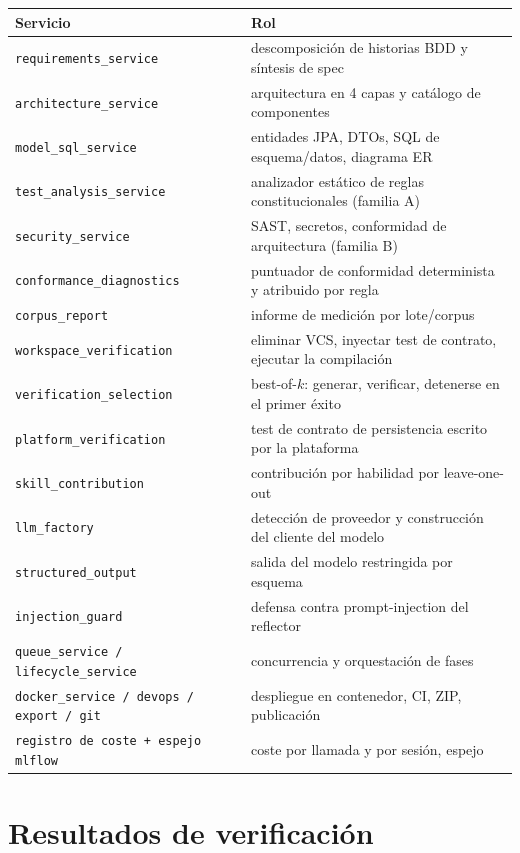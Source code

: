 \documentclass[11pt,a4paper]{article}
\begin{document}
\begin{center}
\begin{longtable}{@{}p{}p{}@{}}
\toprule
\textbf{Servicio} & \textbf{Rol} \\
\midrule
\texttt{requirements\_service} & descomposición de historias BDD y síntesis de spec \\
\texttt{architecture\_service} & arquitectura en 4 capas y catálogo de componentes \\
\texttt{model\_sql\_service} & entidades JPA, DTOs, SQL de esquema/datos, diagrama ER \\
\texttt{test\_analysis\_service} & analizador estático de reglas constitucionales (familia A) \\
\texttt{security\_service} & SAST, secretos, conformidad de arquitectura (familia B) \\
\texttt{conformance\_diagnostics} & puntuador de conformidad determinista y atribuido por regla \\
\texttt{corpus\_report} & informe de medición por lote/corpus \\
\texttt{workspace\_verification} & eliminar VCS, inyectar test de contrato, ejecutar la compilación \\
\texttt{verification\_selection} & best-of-$k$: generar, verificar, detenerse en el primer éxito \\
\texttt{platform\_verification} & test de contrato de persistencia escrito por la plataforma \\
\texttt{skill\_contribution} & contribución por habilidad por leave-one-out \\
\texttt{llm\_factory} & detección de proveedor y construcción del cliente del modelo \\
\texttt{structured\_output} & salida del modelo restringida por esquema \\
\texttt{injection\_guard} & defensa contra prompt-injection del reflector \\
\texttt{queue\_service / lifecycle\_service} & concurrencia y orquestación de fases \\
\texttt{docker\_service / devops / export / git} & despliegue en contenedor, CI, ZIP, publicación \\
\texttt{registro de coste + espejo mlflow} & coste por llamada y por sesión, espejo \\
\bottomrule
\end{longtable}
\end{center}

\section{Resultados de verificación}
\label{sec:verification}
\end{document}
